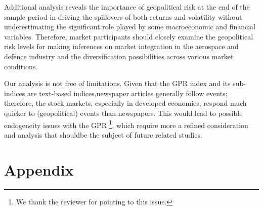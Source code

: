 \documentclass[
  letterpaper,
  DIV=11,
  numbers=noendperiod]{scrartcl}
\begin{document}
Additional analysis reveals the importance of geopolitical risk at the
end of the sample period in driving the spillovers of both returns and
volatility without underestimating the significant role played by some
macroeconomic and financial variables. Therefore, market participants
should closely examine the geopolitical risk levels for making
inferences on market integration in the aerospace and defence industry
and the diversification possibilities across various market conditions.

Our analysis is not free of limitations. Given that the GPR index and
its sub-indices are text-based indices,newspaper articles generally
follow events; therefore, the stock markets, especially in developed
economies, respond much quicker to (geopolitical) events than
newspapers. This would lead to possible endogeneity issues with the GPR
\footnote{We thank the reviewer for pointing to this issue.}, which
require more a refined consideration and analysis that shouldbe the
subject of future related studies.

\hypertarget{appendix}{%
\section{Appendix}\label{appendix}}

\setcounter{table}{0}
\renewcommand{\thetable}{A\arabic{table}}
\end{document}
